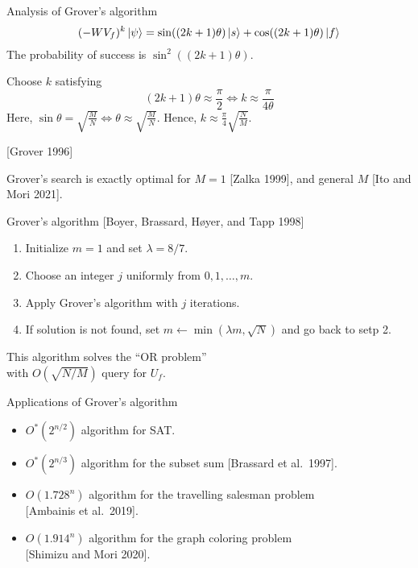 \documentclass{beamer}
\newcommand\emm[1]{\textcolor{redorange}{{#1}}}
\begin{document}
\begin{frame}{Analysis of Grover's algorithm}
\begin{equation*}
(-WV_f)^k \ket{\psi} = \sin((2k + 1)\theta)\ket{s} + \cos((2k+1)\theta)\ket{f}
\end{equation*}
The probability of success is \emm{$\sin^2((2k+1)\theta)$}.

\vspace{1em}
Choose $k$ satisfying
\begin{equation*}
(2k+1)\theta \approx \frac{\pi}2
\iff k \approx \frac{\pi}{4\theta}
\end{equation*}
Here, $\sin\theta = \sqrt{\frac{M}{N}} \iff \theta\approx\sqrt{\frac{M}{N}}$.
Hence, $k\approx \frac{\pi}4\sqrt{\frac{N}{M}}$.

\vspace{1em}
[Grover 1996]

\vspace{2em}
Grover's search is exactly \emm{optimal} for $M=1$ [Zalka 1999], and general $M$ [Ito and Mori 2021].
\end{frame}

\begin{frame}{Grover's algorithm}
[Boyer, Brassard, H\o yer, and Tapp 1998]
\begin{enumerate}
\item Initialize $m = 1$ and set $\lambda = 8/7$.
\item Choose an integer $j$ uniformly from $0,1,\dotsc, m$.
\item Apply Grover's algorithm with $j$ iterations.
\item If solution is not found, set $m\leftarrow\min(\lambda m, \sqrt{N})$ and go back to setp 2.
\end{enumerate}

\vspace{3em}
\centering
This algorithm solves the ``OR problem''\\
 with $O(\sqrt{N/M})$ query for $U_f$.
\end{frame}

\begin{frame}{Applications of Grover's algorithm}
\begin{itemize}
\setlength{\itemsep}{2em}
\item $O^*(2^{n/2})$ algorithm for SAT.
\item $O^*(2^{n/3})$ algorithm for the subset sum [Brassard et al.\ 1997].
\item $O(1.728^{n})$ algorithm for the travelling salesman problem\\
{[Ambainis et al.\ 2019]}.
\item $O(1.914^{n})$ algorithm for the graph coloring problem\\
{[Shimizu and Mori 2020]}.
\end{itemize}
\end{frame}
\end{document}
